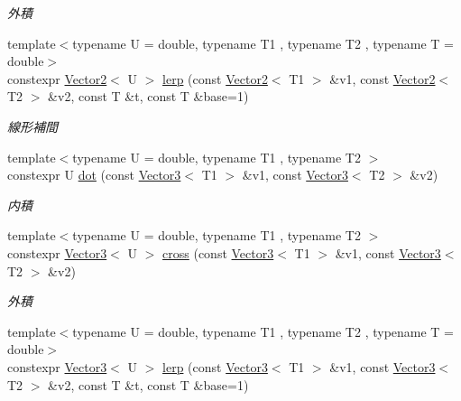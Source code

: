 \begin{DoxyCompactItemize}
\begin{DoxyCompactList}\small\item\em 外積 \end{DoxyCompactList}\item 
{\footnotesize template$<$typename U  = double, typename T1 , typename T2 , typename T  = double$>$ }\\constexpr \mbox{\hyperlink{classsaki_1_1_vector2}{Vector2}}$<$ U $>$ \mbox{\hyperlink{namespacesaki_a5fab9c2e4cffc4270b42004c4334c52a}{lerp}} (const \mbox{\hyperlink{classsaki_1_1_vector2}{Vector2}}$<$ T1 $>$ \&v1, const \mbox{\hyperlink{classsaki_1_1_vector2}{Vector2}}$<$ T2 $>$ \&v2, const T \&t, const T \&base=1)
\begin{DoxyCompactList}\small\item\em 線形補間 \end{DoxyCompactList}\item 
{\footnotesize template$<$typename U  = double, typename T1 , typename T2 $>$ }\\constexpr U \mbox{\hyperlink{namespacesaki_a4f2643c9bd618538a43cdad4a71398af}{dot}} (const \mbox{\hyperlink{classsaki_1_1_vector3}{Vector3}}$<$ T1 $>$ \&v1, const \mbox{\hyperlink{classsaki_1_1_vector3}{Vector3}}$<$ T2 $>$ \&v2)
\begin{DoxyCompactList}\small\item\em 内積 \end{DoxyCompactList}\item 
{\footnotesize template$<$typename U  = double, typename T1 , typename T2 $>$ }\\constexpr \mbox{\hyperlink{classsaki_1_1_vector3}{Vector3}}$<$ U $>$ \mbox{\hyperlink{namespacesaki_a0292208be2262a7ecbba114ebd10d5d6}{cross}} (const \mbox{\hyperlink{classsaki_1_1_vector3}{Vector3}}$<$ T1 $>$ \&v1, const \mbox{\hyperlink{classsaki_1_1_vector3}{Vector3}}$<$ T2 $>$ \&v2)
\begin{DoxyCompactList}\small\item\em 外積 \end{DoxyCompactList}\item 
{\footnotesize template$<$typename U  = double, typename T1 , typename T2 , typename T  = double$>$ }\\constexpr \mbox{\hyperlink{classsaki_1_1_vector3}{Vector3}}$<$ U $>$ \mbox{\hyperlink{namespacesaki_a3530d2e9468376228a3836112bd423c1}{lerp}} (const \mbox{\hyperlink{classsaki_1_1_vector3}{Vector3}}$<$ T1 $>$ \&v1, const \mbox{\hyperlink{classsaki_1_1_vector3}{Vector3}}$<$ T2 $>$ \&v2, const T \&t, const T \&base=1)

\end{DoxyCompactItemize}
